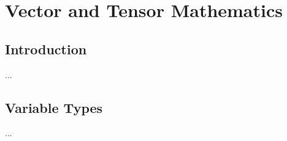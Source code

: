 %
%
%

\chapter{Vector and Tensor Mathematics}

\label{chap:MathAnnex}

\section{Introduction}

...

\section{Variable Types}

...



